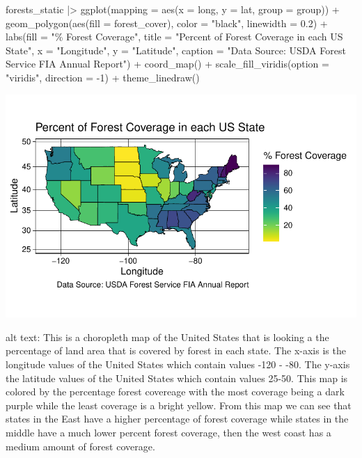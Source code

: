 \documentclass[
  letterpaper,
  DIV=11,
  numbers=noendperiod]{scrartcl}
\newenvironment{Shaded}{\begin{snugshade}}{\end{snugshade}}
\newcommand{\AttributeTok}[1]{\textcolor[rgb]{0.40,0.45,0.13}{#1}}
\newcommand{\DecValTok}[1]{\textcolor[rgb]{0.68,0.00,0.00}{#1}}
\newcommand{\FloatTok}[1]{\textcolor[rgb]{0.68,0.00,0.00}{#1}}
\newcommand{\FunctionTok}[1]{\textcolor[rgb]{0.28,0.35,0.67}{#1}}
\newcommand{\NormalTok}[1]{\textcolor[rgb]{0.00,0.23,0.31}{#1}}
\newcommand{\SpecialCharTok}[1]{\textcolor[rgb]{0.37,0.37,0.37}{#1}}
\newcommand{\StringTok}[1]{\textcolor[rgb]{0.13,0.47,0.30}{#1}}
\begin{document}
\begin{Shaded}
\begin{Highlighting}[]
\NormalTok{forests\_static }\SpecialCharTok{|\textgreater{}}
  \FunctionTok{ggplot}\NormalTok{(}\AttributeTok{mapping =} \FunctionTok{aes}\NormalTok{(}\AttributeTok{x =}\NormalTok{ long, }\AttributeTok{y =}\NormalTok{ lat, }\AttributeTok{group =}\NormalTok{ group)) }\SpecialCharTok{+} 
  \FunctionTok{geom\_polygon}\NormalTok{(}\FunctionTok{aes}\NormalTok{(}\AttributeTok{fill =}\NormalTok{ forest\_cover), }\AttributeTok{color =} \StringTok{"black"}\NormalTok{, }\AttributeTok{linewidth =} \FloatTok{0.2}\NormalTok{) }\SpecialCharTok{+} 
  \FunctionTok{labs}\NormalTok{(}\AttributeTok{fill =} \StringTok{"\% Forest Coverage"}\NormalTok{, }\AttributeTok{title =} \StringTok{"Percent of Forest Coverage in each US State"}\NormalTok{, }\AttributeTok{x =} \StringTok{"Longitude"}\NormalTok{, }\AttributeTok{y =} \StringTok{"Latitude"}\NormalTok{, }\AttributeTok{caption =} \StringTok{"Data Source: USDA Forest Service FIA Annual Report"}\NormalTok{) }\SpecialCharTok{+}
  \FunctionTok{coord\_map}\NormalTok{() }\SpecialCharTok{+}
  \FunctionTok{scale\_fill\_viridis}\NormalTok{(}\AttributeTok{option =} \StringTok{"viridis"}\NormalTok{, }\AttributeTok{direction =} \SpecialCharTok{{-}}\DecValTok{1}\NormalTok{) }\SpecialCharTok{+}
  \FunctionTok{theme\_linedraw}\NormalTok{()}
\end{Highlighting}
\end{Shaded}

\includegraphics{MiniProject1_files/figure-pdf/unnamed-chunk-4-1.pdf}

alt text: This is a choropleth map of the United States that is looking
a the percentage of land area that is covered by forest in each state.
The x-axis is the longitude values of the United States which contain
values -120 - -80. The y-axis the latitude values of the United States
which contain values 25-50. This map is colored by the percentage forest
covereage with the most coverage being a dark purple while the least
coverage is a bright yellow. From this map we can see that states in the
East have a higher percentage of forest coverage while states in the
middle have a much lower percent forest coverage, then the west coast
has a medium amount of forest coverage.
\end{document}
